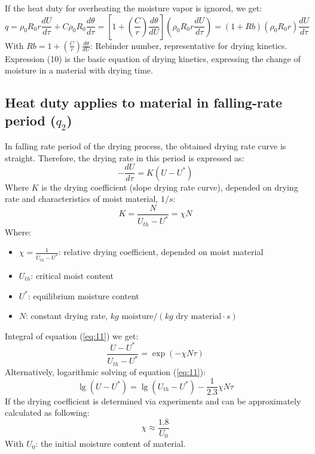 If the heat duty for overheating the moisture vapor is ignored, we get:
\begin{equation}
    q = \rho_0 R_0 r \frac{dU}{d\tau} + C \rho_0 R_0 \frac{d\theta}{d\tau} = \left[1 + \left(\frac{C}{r}\right)\frac{d\theta}{dU}\right] \left(\rho_0 R_0 r \frac{dU}{d\tau}\right) = (1 + Rb)(\rho_0 R_0 r)\frac{dU}{d\tau}
\end{equation}
With $Rb = 1 + \left(\frac{C}{r}\right)\frac{d\theta}{dU}$: Rebinder number, representative for drying kinetics. Expression (10) is the basic equation of drying kinetics, expressing the change of moisture in a material with drying time.

\subsection{Heat duty applies to material in falling-rate period ($q_2$)}
In falling rate period of the drying process, the obtained drying rate curve is straight. Therefore, the drying rate in this period is expressed as:
\begin{equation} \label{eq:11}
    -\frac{dU}{d\tau} = K(U - U^*)
\end{equation}
Where $K$ is the drying coefficient (slope drying rate curve), depended on drying rate and characteristics of moist material, $1/s$:
\begin{equation} \label{eq:12}
    K = \frac{N}{U_{th} - U^*} = \chi N
\end{equation}
Where:
\begin{itemize}
    \item $\chi = \frac{1}{U_{th} - U^*}$: relative drying coefficient, depended on moist material
    \item $U_{th}$: critical moist content
    \item $U^*$: equilibrium moisture content
    \item $N$: constant drying rate, $kg \text{ moisture} / (kg \text{ dry material} \cdot s)$
\end{itemize}

Integral of equation (\ref{eq:11}) we get:
\begin{equation} \label{eq:13}
    \frac{U - U^*}{U_{th} - U^*} = \exp(-\chi N \tau)
\end{equation}
Alternatively, logarithmic solving of equation (\ref{eq:11}):
\begin{equation} \label{eq:14}
    \lg(U - U^*) = \lg(U_{th} - U^*) - \frac{1}{2.3} \chi N \tau
\end{equation}
If the drying coefficient is determined via experiments and can be approximately calculated as following:
\begin{equation} \label{eq:15}
    \chi \approx \frac{1.8}{U_0}
\end{equation}
With $U_0$: the initial moisture content of material.

